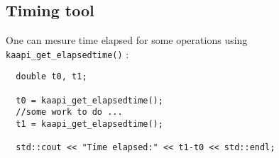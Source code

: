 \documentclass{article}
\begin{document}
\subsection{Timing tool}
One can mesure time elapsed for some operations using \verb+kaapi_get_elapsedtime()+ :

\begin{verbatim}
  double t0, t1;
  
  t0 = kaapi_get_elapsedtime();
  //some work to do ...
  t1 = kaapi_get_elapsedtime();

  std::cout << "Time elapsed:" << t1-t0 << std::endl;
\end{verbatim}
\end{document}

